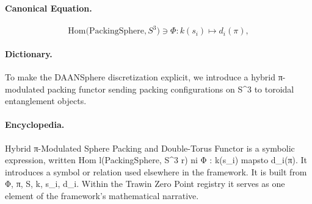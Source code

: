 \paragraph{Canonical Equation.}
\[
\mathrm{Hom}\!\bigl(\text{PackingSphere}, S^3\bigr) \ni \Phi : k(s_i) \mapsto d_i(\pi),
\]

\paragraph{Dictionary.}
To make the DAANSphere discretization explicit, we introduce a hybrid π-modulated packing functor sending packing configurations on S\textasciicircum{}3 to toroidal entanglement objects.

\paragraph{Encyclopedia.}
Hybrid π-Modulated Sphere Packing and Double-Torus Functor is a symbolic expression, written Hom l(PackingSphere, S\textasciicircum{}3 r) ni Φ : k(s\_i) mapsto d\_i(π). It introduces a symbol or relation used elsewhere in the framework. It is built from Φ, π, S, k, s\_i, d\_i. Within the Trawin Zero Point registry it serves as one element of the framework's mathematical narrative.
